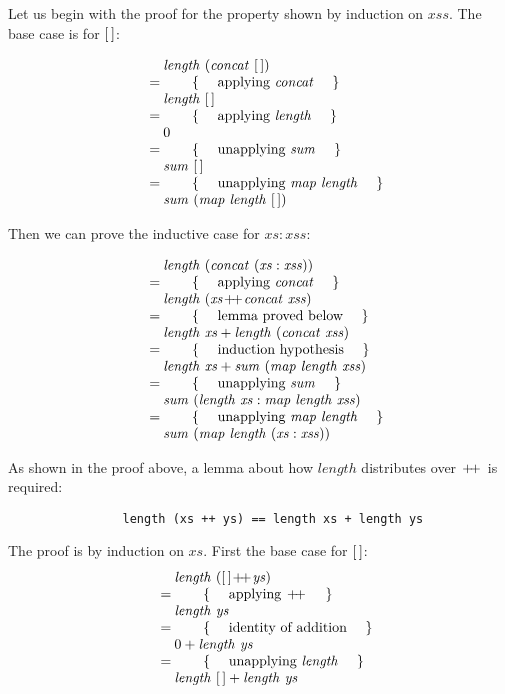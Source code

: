 \begin{parts}
\begin{solution}
		Let us begin with the proof for the property shown by induction on $\mathit{xss}$. The base case is for $\hslist{}$:
		
		\begin{displaymath}
		\begin{array}{cl}
		\expr{\mathit{length}~(\mathit{concat}~\hslist{})}
		\hint{applying $\mathit{concat}$}
		\expr{\mathit{length}~\hslist{}}
		\hint{applying $\mathit{length}$}
		\expr{0}
		\hint{unapplying $\mathit{sum}$}
		\expr{\mathit{sum}~\hslist{}}
		\hint{unapplying $\mathit{map}~\mathit{length}$}
		\lastexpr{\mathit{sum}~(\mathit{map}~\mathit{length}~\hslist{})}
		\end{array}
		\end{displaymath}
		
		Then we can prove the inductive case for $\mathit{xs}:\mathit{xss}$:
		
		\begin{displaymath}
		\begin{array}{cl}
		\expr{\mathit{length}~(\mathit{concat}~(\mathit{xs}:\mathit{xss}))}
		\hint{applying $\mathit{concat}$}
		\expr{\mathit{length}~(\mathit{xs} \append \mathit{concat}~\mathit{xss})}
		\hint{lemma proved below}
		\expr{\mathit{length}~\mathit{xs} + \mathit{length}~(\mathit{concat}~\mathit{xss})}
		\hint{induction hypothesis}
		\expr{\mathit{length}~\mathit{xs} + \mathit{sum}~(\mathit{map}~\mathit{length}~\mathit{xss})}
		\hint{unapplying $\mathit{sum}$}
		\expr{\mathit{sum}~(\mathit{length}~\mathit{xs} : \mathit{map}~\mathit{length}~\mathit{xss})}
		\hint{unapplying $\mathit{map}~\mathit{length}$}
		\lastexpr{\mathit{sum}~(\mathit{map}~\mathit{length}~(\mathit{xs}:\mathit{xss}))}
		\end{array}
		\end{displaymath}
		
		As shown in the proof above, a lemma about how $\mathit{length}$ distributes over $\append$ is required:
		
		\begin{center}
			\begin{small}
				\begin{verbatim}
				length (xs ++ ys) == length xs + length ys
				\end{verbatim}
			\end{small}
		\end{center}
		
		The proof is by induction on $\mathit{xs}$. First the base case for $\hslist{}$:
		\begin{displaymath}
		\begin{array}{cl}
		\expr{\mathit{length}~(\hslist{} \append \mathit{ys})}
		\hint{applying $\append$}
		\expr{\mathit{length}~\mathit{ys}}
		\hint{identity of addition}
		\expr{0 + \mathit{length}~\mathit{ys}}
		\hint{unapplying $\mathit{length}$}
		\lastexpr{\mathit{length}~\hslist{} + \mathit{length}~\mathit{ys}}
		\end{array}
		\end{displaymath}
		

\end{solution}
\end{parts}
